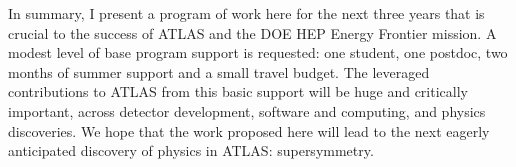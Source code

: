 In summary, I present a program of work here for the next three years that is crucial to the success of ATLAS and the DOE HEP Energy Frontier mission. A modest level of base program support is requested: one student, one postdoc, two months of summer support and a small travel budget. The leveraged contributions to ATLAS from this basic support will be huge and critically important, across detector development, software and computing, and physics discoveries. We hope that the work proposed here will lead to the next eagerly anticipated discovery of physics in ATLAS: supersymmetry.

